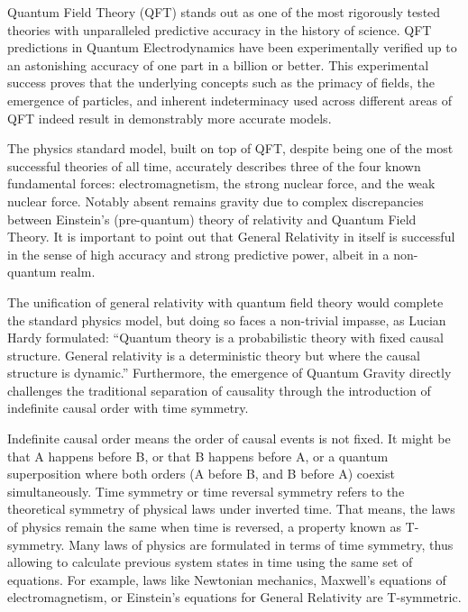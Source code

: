 \documentclass{article}
\begin{document}
Quantum Field Theory\cite{peskin2018introduction} (QFT)  stands out as one of the most rigorously tested theories with unparalleled predictive accuracy in the history of science. QFT predictions in Quantum Electrodynamics have been experimentally verified up to an astonishing accuracy of one part in a billion or better. This experimental success proves that the underlying concepts such as the primacy of fields, the emergence of particles, and inherent indeterminacy used across different areas of QFT indeed result in demonstrably more accurate models.

The physics standard model, built on top of QFT, despite being one of the most successful theories of all time, accurately describes three of the four known fundamental forces: electromagnetism, the strong nuclear force, and the weak nuclear force. Notably absent remains gravity due to complex discrepancies between Einstein’s (pre-quantum) theory of relativity and Quantum Field Theory. It is important to point out that General Relativity in itself is successful in the sense of high accuracy and strong predictive power, albeit in a non-quantum realm.

The unification of general relativity with quantum field theory would complete the standard physics model, but doing so faces a non-trivial impasse, as Lucian Hardy\cite{HardyDynamicCausalStructure} formulated: “Quantum theory is a probabilistic theory with fixed causal structure. General relativity is a deterministic theory but where the causal structure is dynamic.” Furthermore, the emergence of Quantum Gravity directly challenges the traditional separation of causality through the introduction of indefinite causal order with time symmetry\cite{MriniHardyIndefinite}.

Indefinite causal order means the order of causal events is not fixed. It might be that A happens before B, or that B happens before A, or a quantum superposition where both orders (A before B, and B before A) coexist simultaneously. Time symmetry or time reversal symmetry refers to the theoretical symmetry of physical laws under inverted time. That means, the laws of physics remain the same when time is reversed, a property known as T-symmetry. Many laws of physics are formulated in terms of time symmetry, thus allowing to calculate previous system states in time using the same set of equations. For example, laws like Newtonian mechanics, Maxwell's equations of electromagnetism, or Einstein's equations for General Relativity are T-symmetric.
\end{document}
